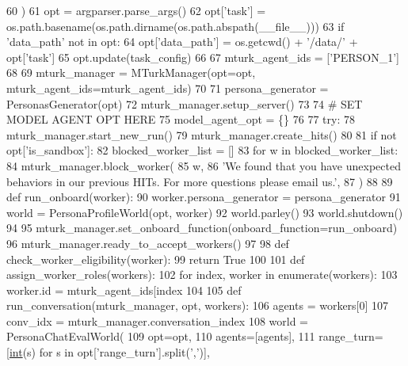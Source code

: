 \begin{DoxyCode}
60     )
61     opt = argparser.parse\_args()
62     opt[\textcolor{stringliteral}{'task'}] = os.path.basename(os.path.dirname(os.path.abspath(\_\_file\_\_)))
63     \textcolor{keywordflow}{if} \textcolor{stringliteral}{'data\_path'} \textcolor{keywordflow}{not} \textcolor{keywordflow}{in} opt:
64         opt[\textcolor{stringliteral}{'data\_path'}] = os.getcwd() + \textcolor{stringliteral}{'/data/'} + opt[\textcolor{stringliteral}{'task'}]
65     opt.update(task\_config)
66 
67     mturk\_agent\_ids = [\textcolor{stringliteral}{'PERSON\_1'}]
68 
69     mturk\_manager = MTurkManager(opt=opt, mturk\_agent\_ids=mturk\_agent\_ids)
70 
71     persona\_generator = PersonasGenerator(opt)
72     mturk\_manager.setup\_server()
73 
74     \textcolor{comment}{# SET MODEL AGENT OPT HERE}
75     model\_agent\_opt = \{\}
76 
77     \textcolor{keywordflow}{try}:
78         mturk\_manager.start\_new\_run()
79         mturk\_manager.create\_hits()
80 
81         \textcolor{keywordflow}{if} \textcolor{keywordflow}{not} opt[\textcolor{stringliteral}{'is\_sandbox'}]:
82             blocked\_worker\_list = []
83             \textcolor{keywordflow}{for} w \textcolor{keywordflow}{in} blocked\_worker\_list:
84                 mturk\_manager.block\_worker(
85                     w,
86                     \textcolor{stringliteral}{'We found that you have unexpected behaviors in our previous HITs. For more questions
       please email us.'},
87                 )
88 
89         \textcolor{keyword}{def }run\_onboard(worker):
90             worker.persona\_generator = persona\_generator
91             world = PersonaProfileWorld(opt, worker)
92             world.parley()
93             world.shutdown()
94 
95         mturk\_manager.set\_onboard\_function(onboard\_function=run\_onboard)
96         mturk\_manager.ready\_to\_accept\_workers()
97 
98         \textcolor{keyword}{def }check\_worker\_eligibility(worker):
99             \textcolor{keywordflow}{return} \textcolor{keyword}{True}
100 
101         \textcolor{keyword}{def }assign\_worker\_roles(workers):
102             \textcolor{keywordflow}{for} index, worker \textcolor{keywordflow}{in} enumerate(workers):
103                 worker.id = mturk\_agent\_ids[index %
104 
105         \textcolor{keyword}{def }run\_conversation(mturk\_manager, opt, workers):
106             agents = workers[0]
107             conv\_idx = mturk\_manager.conversation\_index
108             world = PersonaChatEvalWorld(
109                 opt=opt,
110                 agents=[agents],
111                 range\_turn=[\hyperlink{namespaceprojects_1_1mastering__the__dungeon_1_1mturk_1_1tasks_1_1MTD_1_1run_a693eb03afbb820bbfe8b47b12e69e519}{int}(s) \textcolor{keywordflow}{for} s \textcolor{keywordflow}{in} opt[\textcolor{stringliteral}{'range\_turn'}].split(\textcolor{stringliteral}{','})],

\end{DoxyCode}
